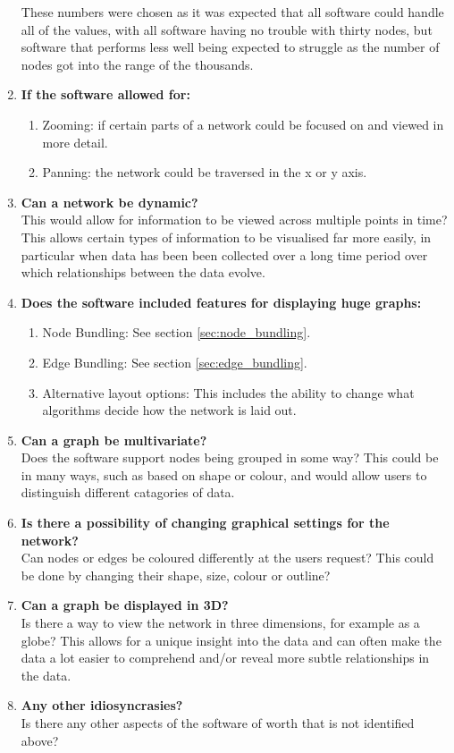 \documentclass[../dissertation.tex]{subfiles}
\begin{document}
\begin{enumerate}
	These numbers were chosen as it was expected that all software could handle all of the values, with all software having no trouble with thirty nodes, but software that performs less well being expected to struggle as the number of nodes got into the range of the thousands. 
	\item \textbf{If the software allowed for:}
	\begin{enumerate}
		\item Zooming: if certain parts of a network could be focused on and viewed in more detail.
		\item Panning: the network could be traversed in the x or y axis.
	\end{enumerate}
	\item \textbf{Can a network be dynamic?}\\
	This would allow for information to be viewed across multiple points in time? This allows certain types of information to be visualised far more easily, in particular when data has been been collected over a long time period over which relationships between the data evolve.
	\item \textbf{Does the software included features for displaying huge graphs:}
	\begin{enumerate} 
		\item Node Bundling: See section \ref{sec:node_bundling}.
		\item Edge Bundling: See section \ref{sec:edge_bundling}.
		\item Alternative layout options: This includes the ability to change what algorithms decide how the network is laid out.
	\end{enumerate}
	\item \textbf{Can a graph be multivariate?}\\
	Does the software support nodes being grouped in some way? This could be in many ways, such as based on shape or colour, and would allow users to distinguish different catagories of data.
	\item \textbf{Is there a possibility of changing graphical settings for the network?}\\
	Can nodes or edges be coloured differently at the users request? This could be done by changing their shape, size, colour or outline?
	\item \textbf{Can a graph be displayed in 3D?}\\
	Is there a way to view the network in three dimensions, for example as a globe? This allows for a unique insight into the data and can often make the data a lot easier to comprehend and/or reveal more subtle relationships in the data.
	\item \textbf{Any other idiosyncrasies?}\\
	Is there any other aspects of the software of worth that is not identified above?
\end{enumerate}
\end{document}
